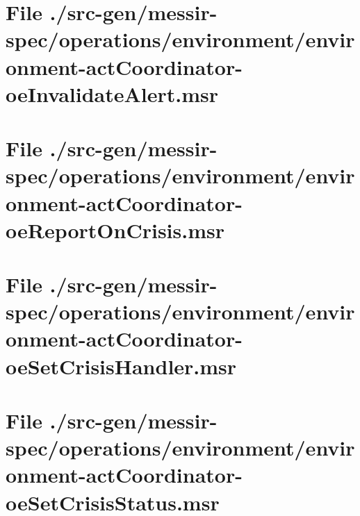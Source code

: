 \section[File /src-gen/messir-spec.../environment-actCoordinator-oeInvalidateAlert.msr]{File ./src-gen/messir-spec/operations/environment/environment-actCoordinator-oeInvalidateAlert.msr}
\scriptsize

\normalsize
	
\section[File /src-gen/messir-spec.../environment-actCoordinator-oeReportOnCrisis.msr]{File ./src-gen/messir-spec/operations/environment/environment-actCoordinator-oeReportOnCrisis.msr}
\scriptsize

\normalsize
	
\section[File /src-gen/messir-spec.../environment-actCoordinator-oeSetCrisisHandler.msr]{File ./src-gen/messir-spec/operations/environment/environment-actCoordinator-oeSetCrisisHandler.msr}
\scriptsize

\normalsize
	
\section[File /src-gen/messir-spec.../environment-actCoordinator-oeSetCrisisStatus.msr]{File ./src-gen/messir-spec/operations/environment/environment-actCoordinator-oeSetCrisisStatus.msr}
\scriptsize

\normalsize
	
